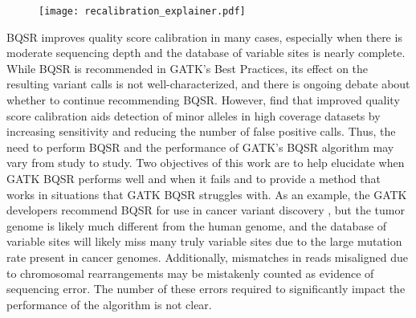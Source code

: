 \begin{figure}
\centering
	\texttt{[image: recalibration\_explainer.pdf]}
	\label{fig:recal_explain}
\end{figure}


BQSR improves quality score calibration in many cases, especially when there is moderate sequencing depth and the database of variable sites is nearly complete. %
While BQSR is recommended in GATK's Best Practices, its effect on the resulting variant calls is not well-characterized, and there is ongoing debate about whether to continue recommending BQSR. \parencite{van_der_auwera_geraldine_2020, van_der_auwera_geraldine_2020_b}
However, \textcite{ni_improvement_2016} find that improved quality score calibration aids detection of minor alleles in high coverage datasets by increasing sensitivity and reducing the number of false positive calls.
Thus, the need to perform BQSR and the performance of GATK's BQSR algorithm may vary from study to study.
Two objectives of this work are to help elucidate when GATK BQSR performs well and when it fails and to provide a method that works in situations that GATK BQSR struggles with.
As an example, the GATK developers recommend BQSR for use in cancer variant discovery \parencite{cibulskis_sensitive_2013}, but the tumor genome is likely much different from the human genome, and the database of variable sites will likely miss many truly variable sites due to the large mutation rate present in cancer genomes. Additionally, mismatches in reads misaligned due to chromosomal rearrangements may be mistakenly counted as evidence of sequencing error. The number of these errors required to significantly impact the performance of the algorithm is not clear.

